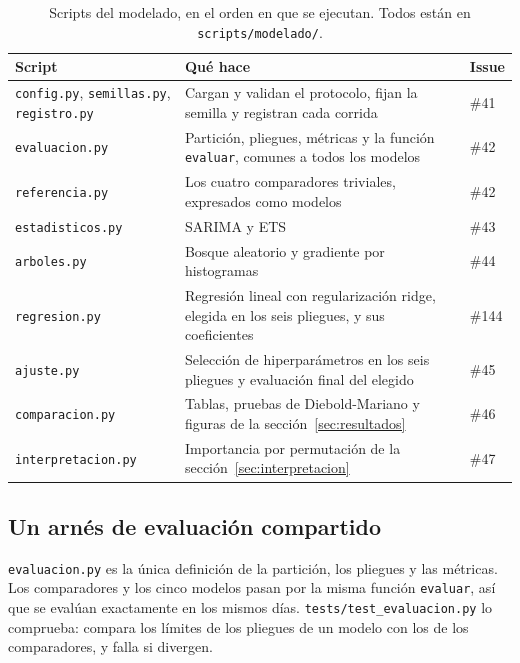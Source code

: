 \begin{table}[H]
\centering
\caption{Scripts del modelado, en el orden en que se ejecutan. Todos están en \texttt{scripts/\allowbreak{}modelado/}.}\label{tab:imp-scripts}
\small
\begin{tabular}{@{}>{\raggedright\arraybackslash}p{3.6cm}>{\raggedright\arraybackslash}p{8.2cm}l@{}}
\toprule
\textbf{Script} & \textbf{Qué hace} & \textbf{Issue} \\
\midrule
\texttt{config.py}, \texttt{semillas.py}, \texttt{registro.py} & Cargan y validan el protocolo, fijan la semilla y registran cada corrida & \#41 \\
\texttt{evaluacion.py} & Partición, pliegues, métricas y la función \texttt{evaluar}, comunes a todos los modelos & \#42 \\
\texttt{referencia.py} & Los cuatro comparadores triviales, expresados como modelos & \#42 \\
\texttt{estadisticos.py} & SARIMA y ETS & \#43 \\
\texttt{arboles.py} & Bosque aleatorio y gradiente por histogramas & \#44 \\
\texttt{regresion.py} & Regresión lineal con regularización ridge, elegida en los seis pliegues, y sus coeficientes & \#144 \\
\texttt{ajuste.py} & Selección de hiperparámetros en los seis pliegues y evaluación final del elegido & \#45 \\
\texttt{comparacion.py} & Tablas, pruebas de Diebold-Mariano y figuras de la sección~\ref{sec:resultados} & \#46 \\
\texttt{interpretacion.py} & Importancia por permutación de la sección~\ref{sec:interpretacion} & \#47 \\
\bottomrule
\end{tabular}
\end{table}

\subsection{Un arnés de evaluación compartido}\label{sec:imp-arnes}

\texttt{evaluacion.py} es la única definición de la partición, los pliegues y las métricas. Los comparadores y los cinco modelos pasan por la misma función \texttt{evaluar}, así que se evalúan exactamente en los mismos días. \texttt{tests/\allowbreak{}test\_\allowbreak{}evaluacion.py} lo comprueba: compara los límites de los pliegues de un modelo con los de los comparadores, y falla si divergen.

